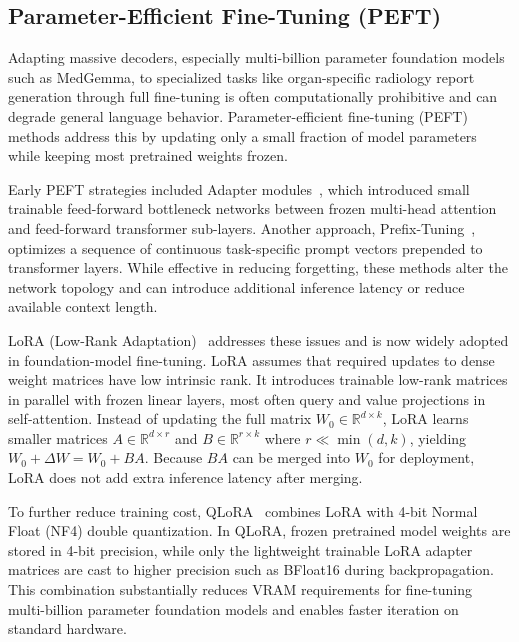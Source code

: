 \subsection{Parameter-Efficient Fine-Tuning (PEFT)}

Adapting massive decoders, especially multi-billion parameter foundation models such as MedGemma, to specialized tasks like organ-specific radiology report generation through full fine-tuning is often computationally prohibitive and can degrade general language behavior. Parameter-efficient fine-tuning (PEFT) methods address this by updating only a small fraction of model parameters while keeping most pretrained weights frozen.

Early PEFT strategies included Adapter modules~\cite{houlsby2019parameter}, which introduced small trainable feed-forward bottleneck networks between frozen multi-head attention and feed-forward transformer sub-layers. Another approach, Prefix-Tuning~\cite{li2021prefix}, optimizes a sequence of continuous task-specific prompt vectors prepended to transformer layers. While effective in reducing forgetting, these methods alter the network topology and can introduce additional inference latency or reduce available context length.

LoRA (Low-Rank Adaptation)~\cite{hu2022lora} addresses these issues and is now widely adopted in foundation-model fine-tuning. LoRA assumes that required updates to dense weight matrices have low intrinsic rank. It introduces trainable low-rank matrices in parallel with frozen linear layers, most often query and value projections in self-attention. Instead of updating the full matrix $W_0 \in \mathbb{R}^{d \times k}$, LoRA learns smaller matrices $A \in \mathbb{R}^{d \times r}$ and $B \in \mathbb{R}^{r \times k}$ where $r \ll \min(d, k)$, yielding $W_0 + \Delta W = W_0 + B A$. Because $B A$ can be merged into $W_0$ for deployment, LoRA does not add extra inference latency after merging.

To further reduce training cost, \ac{QLoRA}~\cite{dettmers2023qlora} combines LoRA with 4-bit Normal Float (\ac{NF4}) double quantization. In \ac{QLoRA}, frozen pretrained model weights are stored in 4-bit precision, while only the lightweight trainable LoRA adapter matrices are cast to higher precision such as BFloat16 during backpropagation. This combination substantially reduces \ac{VRAM} requirements for fine-tuning multi-billion parameter foundation models and enables faster iteration on standard hardware.

